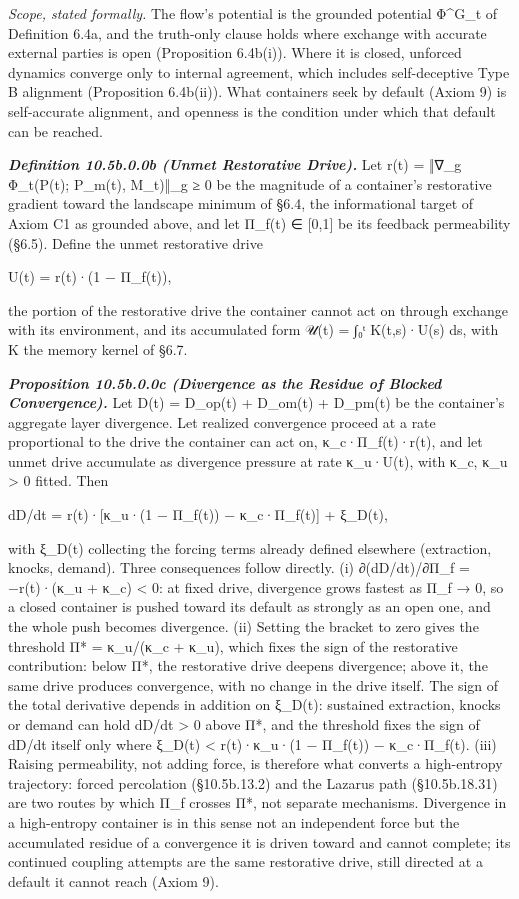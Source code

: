 \documentclass[
]{article}
\begin{document}
\emph{Scope, stated formally.} The flow's potential is the grounded
potential Φ\^{}G\_t of Definition 6.4a, and the truth-only clause holds
where exchange with accurate external parties is open (Proposition
6.4b(i)). Where it is closed, unforced dynamics converge only to
internal agreement, which includes self-deceptive Type B alignment
(Proposition 6.4b(ii)). What containers seek by default (Axiom 9) is
self-accurate alignment, and openness is the condition under which that
default can be reached.

\emph{\textbf{Definition 10.5b.0.0b (Unmet Restorative Drive).}} Let
r(t) = ‖∇\_g Φ\_t(P(t); P\_m(t), M\_t)‖\_g ≥ 0 be the magnitude of a
container's restorative gradient toward the landscape minimum of §6.4,
the informational target of Axiom C1 as grounded above, and let Π\_f(t)
∈ {[}0,1{]} be its feedback permeability (§6.5). Define the unmet
restorative drive

U(t) = r(t)·(1 − Π\_f(t)),

the portion of the restorative drive the container cannot act on through
exchange with its environment, and its accumulated form 𝒰(t) = ∫₀ᵗ
K(t,s)·U(s) ds, with K the memory kernel of §6.7.

\emph{\textbf{Proposition 10.5b.0.0c (Divergence as the Residue of
Blocked Convergence).}} Let D(t) = D\_op(t) + D\_om(t) + D\_pm(t) be the
container's aggregate layer divergence. Let realized convergence proceed
at a rate proportional to the drive the container can act on,
κ\_c·Π\_f(t)·r(t), and let unmet drive accumulate as divergence pressure
at rate κ\_u·U(t), with κ\_c, κ\_u \textgreater{} 0 fitted. Then

dD/dt = r(t)·{[}κ\_u·(1 − Π\_f(t)) − κ\_c·Π\_f(t){]} + ξ\_D(t),

with ξ\_D(t) collecting the forcing terms already defined elsewhere
(extraction, knocks, demand). Three consequences follow directly. (i)
∂(dD/dt)/∂Π\_f = −r(t)·(κ\_u + κ\_c) \textless{} 0: at fixed drive,
divergence grows fastest as Π\_f → 0, so a closed container is pushed
toward its default as strongly as an open one, and the whole push
becomes divergence. (ii) Setting the bracket to zero gives the threshold
Π* = κ\_u/(κ\_c + κ\_u), which fixes the sign of the restorative
contribution: below Π*, the restorative drive deepens divergence; above
it, the same drive produces convergence, with no change in the drive
itself. The sign of the total derivative depends in addition on ξ\_D(t):
sustained extraction, knocks or demand can hold dD/dt \textgreater{} 0
above Π*, and the threshold fixes the sign of dD/dt itself only where
\textbar ξ\_D(t)\textbar{} \textless{} r(t)·\textbar κ\_u·(1 − Π\_f(t))
− κ\_c·Π\_f(t)\textbar. (iii) Raising permeability, not adding force, is
therefore what converts a high-entropy trajectory: forced percolation
(§10.5b.13.2) and the Lazarus path (§10.5b.18.31) are two routes by
which Π\_f crosses Π*, not separate mechanisms. Divergence in a
high-entropy container is in this sense not an independent force but the
accumulated residue of a convergence it is driven toward and cannot
complete; its continued coupling attempts are the same restorative
drive, still directed at a default it cannot reach (Axiom 9).
\end{document}
